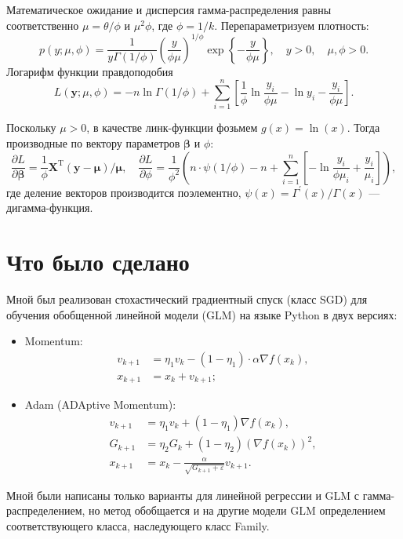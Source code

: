 \documentclass[a4paper]{article}
\begin{document}
Математическое ожидание и дисперсия гамма-распределения равны соответственно $\mu=\theta/\phi$ и $\mu^2 \phi$, где $\phi=1/k$. Перепараметризуем плотность:
\[
    p(y; \mu, \phi)=\frac{1}{y\Gamma(1/\phi)}\left(\frac{y}{\phi\mu}\right)^{1/\phi} \exp\left\{-\frac{y}{\phi\mu}\right\},\quad y > 0,\quad \mu,\phi>0.
\]
Логарифм функции правдоподобия
\[
    L(\mathbf{y}; \mu, \phi)=-n\ln\Gamma(1/\phi)+\sum_{i=1}^n\left[\frac1\phi\ln\frac{y_i}{\phi\mu} - \ln y_i- \frac{y_i}{\phi\mu} \right].
\]

Поскольку $\mu>0$, в качестве линк-функции фозьмем $g(x)=\ln(x)$. Тогда производные по вектору параметров $\bm\beta$ и $\phi$:
\[
    \frac{\partial L}{\partial \bm\beta}=\frac1\phi\mathbf{X}^\mathrm{T} (\mathbf{y} - \bm\mu) / \bm\mu,\quad \frac{\partial L}{\partial \phi}=\frac1{\phi^2}\left(n \cdot\psi(1 / \phi) - n + \sum_{i=1}^n\left[-\ln\frac{y_i}{\phi\mu_i}+ \frac{y_i}{\mu_i}\right]\right),
\]
где деление векторов производится поэлементно, $\psi(x)=\Gamma^\prime(x)/\Gamma(x)$ — дигамма-функция.

\section{Что было сделано}
Мной был реализован стохастический градиентный спуск (класс \textsf{SGD}) для обучения обобщенной линейной модели (GLM) на языке Python в двух версиях:
\begin{itemize}
    \item Momentum:
          \begin{align*}
              v_{k+1} & = \eta_1 v_{k} - (1 - \eta_1) \cdot \alpha \nabla f(x_k), \\
              x_{k+1} & = x_k + v_{k+1};
          \end{align*}
    \item Adam (ADAptive Momentum):
          \begin{align*}
              v_{k+1} & = \eta_1 v_{k} + (1 - \eta_1)  \nabla f(x_k),               \\
              G_{k+1} & = \eta_2 G_{k} + (1 - \eta_2) \left(\nabla f(x_k)\right)^2, \\
              x_{k+1} & = x_k - \frac{\alpha}{\sqrt{G_{k+1} + \varepsilon}}v_{k+1}.
          \end{align*}
\end{itemize}
Мной были написаны только варианты для линейной регрессии и GLM с гамма-распределением, но метод обобщается и на другие модели GLM определением соответствующего класса, наследующего класс \textsf{Family}.
\end{document}
